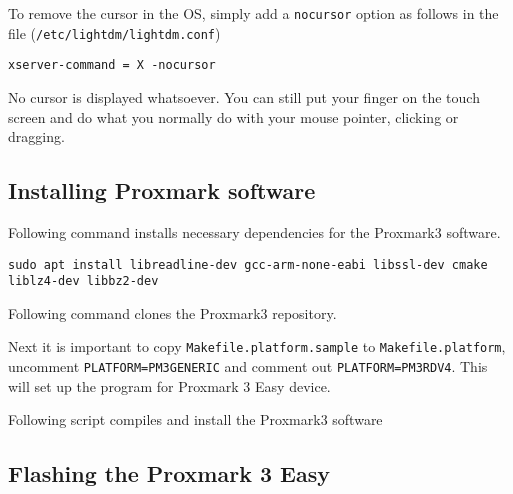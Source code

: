 To remove the cursor in the OS, simply add a \texttt{nocursor} option as
follows in the file (\texttt{/etc/lightdm/lightdm.conf})

\begin{verbatim}
xserver-command = X -nocursor
\end{verbatim}

No cursor is displayed whatsoever. You can still put your finger on the
touch screen and do what you normally do with your mouse pointer,
clicking or dragging.

\subsection{Installing Proxmark
software}\label{installing-proxmark-software}

Following command installs necessary dependencies for the Proxmark3
software.

\begin{verbatim}
sudo apt install libreadline-dev gcc-arm-none-eabi libssl-dev cmake liblz4-dev libbz2-dev
\end{verbatim}

Following command clones the Proxmark3 repository.

\begin{Shaded}
\begin{Highlighting}[]
\end{Highlighting}
\end{Shaded}

Next it is important to copy \texttt{Makefile.platform.sample} to
\texttt{Makefile.platform}, uncomment \texttt{PLATFORM=PM3GENERIC} and
comment out \texttt{PLATFORM=PM3RDV4}. This will set up the program for
Proxmark 3 Easy device.

Following script compiles and install the Proxmark3 software

\begin{Shaded}
\begin{Highlighting}[]
\KeywordTok{\&\&} 
\end{Highlighting}
\end{Shaded}

\subsection{Flashing the Proxmark 3
Easy}\label{flashing-the-proxmark-3-easy}

